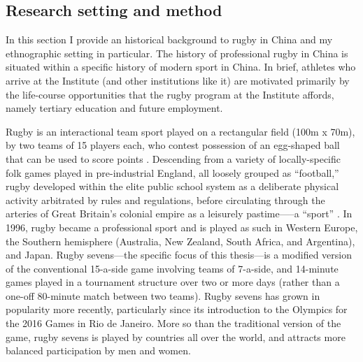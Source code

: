 \begin{CJK}{UTF8}{gbsn}




 \section{Research setting and method\label{sect:researchSettingMethod}}
 In this section I provide an historical background to rugby in China and my ethnographic setting in particular.  The history of professional rugby in China is situated within a specific history of modern sport in China.  In brief, athletes who arrive at the Institute (and other institutions like it) are motivated primarily by the life-course opportunities that the rugby program at the Institute affords, namely tertiary education and future employment.

 Rugby is an interactional team sport played on a rectangular field (100m x 70m), by two teams of 15 players each, who contest possession of an egg-shaped ball that can be used to score points \citep{IRB2014}.  Descending from a variety of locally-specific folk games played in pre-industrial England, all loosely grouped as ``football,'' rugby developed within the elite public school system as a deliberate physical activity arbitrated by rules and regulations, before circulating through the arteries of Great Britain's colonial empire as a leisurely pastime—--a ``sport'' \citep{Dunning2005}.  In 1996, rugby became a professional sport and is played as such in Western Europe, the Southern hemisphere (Australia, New Zealand, South Africa, and Argentina), and Japan. Rugby sevens---the specific focus of this thesis---is a modified version of the conventional 15-a-side game involving teams of 7-a-side, and 14-minute games played in a tournament structure over two or more days (rather than a one-off 80-minute match between two teams).  Rugby sevens has grown in popularity more recently, particularly since its introduction to the Olympics for the 2016 Games in Rio de Janeiro.  More so than the traditional version of the game, rugby sevens is played by countries all over the world, and attracts more balanced participation by men and women.


\end{CJK}
